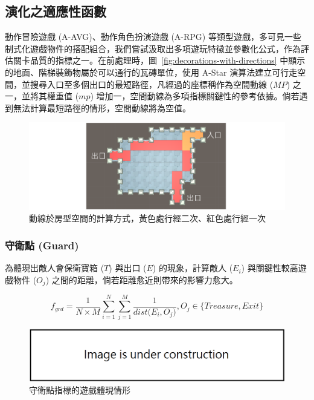 \subsection{演化之適應性函數}
\label{ssec:method-segments-fitnesses}

動作冒險遊戲 (A-AVG)、動作角色扮演遊戲 (A-RPG) 等類型遊戲，多可見一些制式化遊戲物件的搭配組合，我們嘗試汲取出多項遊玩特徵並參數化公式，作為評估關卡品質的指標之一。在前處理時，圖~\ref{fig:decorations-with-directions} 中顯示的地面、階梯裝飾物屬於可以通行的瓦磚單位，使用 A-Star 演算法建立可行走空間，並搜尋入口至多個出口的最短路徑，凡經過的座標稱作為空間動線 ($MP$) 之一，並將其權重值 ($mp$) 增加一，空間動線為多項指標關鍵性的參考依據。倘若遇到無法計算最短路徑的情形，空間動線將為空值。

\begin{figure}[ht]
  \begin{center}
    \includegraphics[width=1.0\textwidth]{figures/fitnesses-mainpath.png}
    \caption{動線於房型空間的計算方式，黃色處行經二次、紅色處行經一次}
    \label{fig:fitnesses-mainpath}
  \end{center}
\end{figure}

\subsubsection{守衛點 (Guard)}
\label{sssec:method-segments-fitnesses-guard}

為體現出敵人會保衛寶箱 ($T$) 與出口 ($E$) 的現象，計算敵人 ($E_{i}$) 與關鍵性較高遊戲物件 ($O_{j}$) 之間的距離，倘若距離愈近則帶來的影響力愈大。

\begin{equation}
    f_{grd}=\frac{1}{N \times M} \sum_{i=1}^{N} \sum_{j=1}^{M} \frac{1}{dist\big(E_{i}, O_{j}\big)}, O_{j} \in \{ Treasure, Exit \}
\end{equation}

\begin{figure}[ht]
  \begin{center}
    \includegraphics[width=1.0\textwidth]{figures/under_construction.png}
    \caption{守衛點指標的遊戲體現情形}
    \label{fig:fitnesses-guard-gameplay}
  \end{center}
\end{figure}

